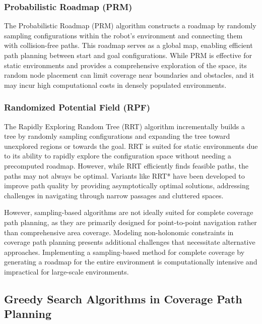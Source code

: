 \subsubsection{Probabilistic Roadmap (PRM)}

The Probabilistic Roadmap (PRM) algorithm constructs a roadmap by randomly sampling configurations within the robot's environment and connecting them with collision-free paths. This roadmap serves as a global map, enabling efficient path planning between start and goal configurations. While PRM is effective for static environments and provides a comprehensive exploration of the space, its random node placement can limit coverage near boundaries and obstacles, and it may incur high computational costs in densely populated environments.


\subsubsection{Randomized Potential Field (RPF)}

The Rapidly Exploring Random Tree (RRT) algorithm incrementally builds a tree by randomly sampling configurations and expanding the tree toward unexplored regions or towards the goal. RRT is suited for static environments due to its ability to rapidly explore the configuration space without needing a precomputed roadmap. However, while RRT efficiently finds feasible paths, the paths may not always be optimal. Variants like RRT* have been developed to improve path quality by providing asymptotically optimal solutions, addressing challenges in navigating through narrow passages and cluttered spaces.

\vspace*{6mm}


However, sampling-based algorithms are not ideally suited for complete coverage path planning, as they are primarily designed for point-to-point navigation rather than comprehensive area coverage. Modeling non-holonomic constraints in coverage path planning presents additional challenges that necessitate alternative approaches. Implementing a sampling-based method for complete coverage by generating a roadmap for the entire environment is computationally intensive and impractical for large-scale environments.



\subsection{Greedy Search Algorithms in Coverage Path Planning}

